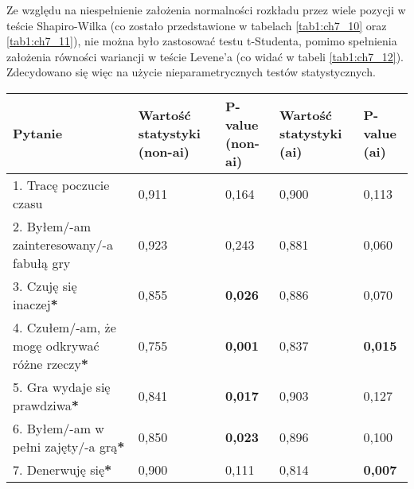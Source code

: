 Ze względu na niespełnienie założenia normalności rozkładu przez wiele pozycji w teście Shapiro-Wilka (co zostało
przedstawione w tabelach \ref{tab1:ch7_10} oraz \ref{tab1:ch7_11}), nie można było zastosować testu t-Studenta,
pomimo spełnienia założenia równości wariancji w teście Levene'a (co widać w tabeli \ref{tab1:ch7_12}). Zdecydowano
się więc na użycie nieparametrycznych testów statystycznych.

\newpage

\begin{table}[!h]
    \begin{center}
        \begin{tabular}{|m{10em}|m{5em}|m{5em}|m{5em}|m{5em}|}
            \hline
            Pytanie                                                                     & Wartość statystyki (non-\gls{ai}) & P-value (non-\gls{ai}) & Wartość statystyki (\gls{ai}) & P-value (\gls{ai}) \\
            \hline
            1. Tracę poczucie czasu                                                     & 0,911                             & 0,164                  & 0,900                         & 0,113              \\
            2. Byłem/-am \newline zainteresowany/-a fabułą gry                          & 0,923                             & 0,243                  & 0,881                         & 0,060              \\
            3. Czuję się inaczej\textbf{*}                                              & 0,855                             & \textbf{0,026}         & 0,886                         & 0,070              \\
            4. Czułem/-am, że mogę odkrywać różne rzeczy\textbf{*}                      & 0,755                             & \textbf{0,001}         & 0,837                         & \textbf{0,015}     \\
            5. Gra wydaje się prawdziwa\textbf{*}                                       & 0,841                             & \textbf{0,017}         & 0,903                         & 0,127              \\
            6. Byłem/-am \newline w pełni zajęty/-a grą\textbf{*}                       & 0,850                             & \textbf{0,023}         & 0,896                         & 0,100              \\
            7. Denerwuję się\textbf{*}                                                  & 0,900                             & 0,111                  & 0,814                         & \textbf{0,007}     \\

\end{tabular}
\end{center}
\end{table}
